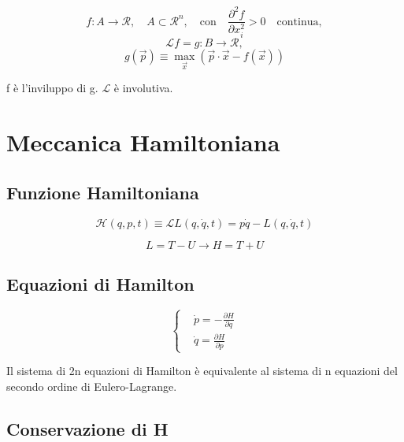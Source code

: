\documentclass{article}
\begin{document}
            \[
                f: A \rightarrow \mathcal{R}, \quad A \subset \mathcal{R}^n, \quad \text{con} \quad \frac{\partial ^2 f}{\partial x_i^2}>0 \quad \text{continua},
            \]
            \[
                \mathcal{L}f = g: B \rightarrow \mathcal{R},
            \]
            \[
                g(\vec{p}) \equiv \max_{\vec{x}} (\vec{p} \cdot \vec{x} - f(\vec{x}))
            \]

            f è l'inviluppo di g.
        $\mathcal{L}$ è involutiva.


            \section{Meccanica Hamiltoniana}

            \subsection{Funzione Hamiltoniana}

            \begin{equation}
                \mathcal{H}(q,p, t)\equiv \mathcal{L}L(q,\dot q, t)= p\dot q- L(q,\dot q, t)
            \end{equation}

            \begin{equation}
                L=T-U \rightarrow H= T+U
            \end{equation}

            \subsection{Equazioni di Hamilton}
            \begin{equation}
                \left\{
                \begin{aligned}
                     & \dot p=-\frac{\partial H}{\partial q} \\
                     & \dot q= \frac{\partial H}{\partial p}
                \end{aligned}
                \right.
            \end{equation}

            Il sistema di 2n equazioni di Hamilton è equivalente al sistema di n equazioni del secondo ordine di Eulero-Lagrange.

            \subsection{Conservazione di H}
\end{document}
